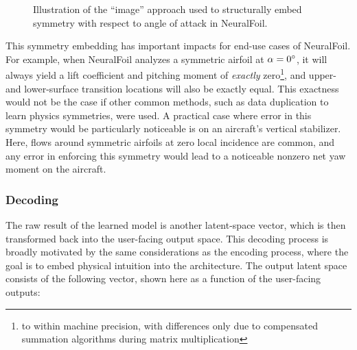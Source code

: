 \begin{figure}[H]
    \centering
    
    \caption{Illustration of the ``image'' approach used to structurally embed symmetry with respect to angle of attack in NeuralFoil.}
    \label{fig:nf-alpha_symmetry}
\end{figure}

This symmetry embedding has important impacts for end-use cases of NeuralFoil. For example, when NeuralFoil analyzes a symmetric airfoil at $\alpha=0\degree$, it will always yield a lift coefficient and pitching moment of \textit{exactly} zero\footnote{to within machine precision, with differences only due to compensated summation algorithms during matrix multiplication}, and upper- and lower-surface transition locations will also be exactly equal. This exactness would not be the case if other common methods, such as data duplication to learn physics symmetries, were used. A practical case where error in this symmetry would be particularly noticeable is on an aircraft's vertical stabilizer. Here, flows around symmetric airfoils at zero local incidence are common, and any error in enforcing this symmetry would lead to a noticeable nonzero net yaw moment on the aircraft.

\subsubsection{Decoding}

The raw result of the learned model is another latent-space vector, which is then transformed back into the user-facing output space. This decoding process is broadly motivated by the same considerations as the encoding process, where the goal is to embed physical intuition into the architecture. The output latent space consists of the following vector, shown here as a function of the user-facing outputs:

